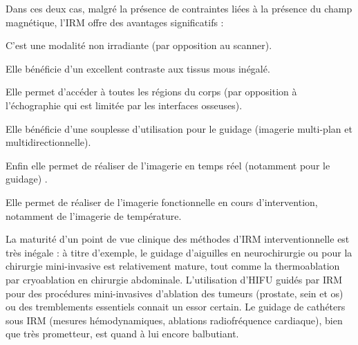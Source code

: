 \documentclass[10pt,a4paper]{report}
\begin{document}

Dans ces deux cas, malgré la présence de contraintes liées à la présence du champ magnétique, l’IRM offre des avantages significatifs :\\

\begin{description}
    \item C’est une modalité non irradiante (par opposition au scanner). 
    \item Elle bénéficie d’un excellent contraste aux tissus mous inégalé.
    \item Elle permet d’accéder à toutes les régions du corps (par opposition à l’échographie qui est
limitée par les interfaces osseuses).
    \item Elle bénéficie d’une souplesse d’utilisation pour le guidage (imagerie multi-plan et multidirectionnelle).
    \item Enfin elle permet de réaliser de l’imagerie en temps réel (notamment pour le guidage) .
    \item Elle permet de réaliser de l’imagerie fonctionnelle en cours d’intervention, notamment de
l’imagerie de température.
\end{description}

La maturité d’un point de vue clinique des méthodes d’IRM interventionnelle est très inégale : à titre d’exemple, le guidage d’aiguilles en neurochirurgie ou pour la chirurgie mini-invasive est relativement mature, tout comme la thermoablation par cryoablation en chirurgie abdominale. L’utilisation d’HIFU guidés par IRM pour des procédures mini-invasives d’ablation des tumeurs (prostate, sein et os) ou des tremblements essentiels connait un essor certain. Le guidage de cathéters sous IRM (mesures hémodynamiques, ablations radiofréquence cardiaque), bien que très prometteur, est quand à lui encore balbutiant.\\
\end{document}
